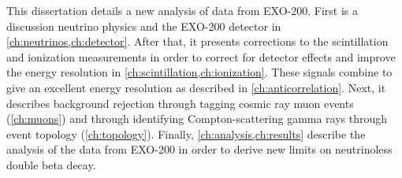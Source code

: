 \documentclass[herrin-thesis.tex]{subfiles}
\begin{document}
This dissertation details a new analysis of data from EXO-200. First is a discussion neutrino physics and the EXO-200 detector in \cref{ch:neutrinos,ch:detector}. After that, it presents corrections to the scintillation and ionization measurements in order to correct for detector effects and improve the energy resolution in \cref{ch:scintillation,ch:ionization}. These signals combine to give an excellent energy resolution as described in \cref{ch:anticorrelation}. Next, it describes background rejection through tagging cosmic ray muon events (\cref{ch:muons}) and through identifying Compton-scattering gamma rays through event topology (\cref{ch:topology}). Finally, \cref{ch:analysis,ch:results} describe the analysis of the data from EXO-200 in order to derive new limits on neutrinoless double beta decay. 
\end{document}
